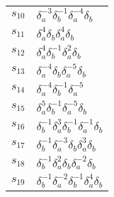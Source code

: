 \documentclass{article}
\begin{document}
\begin{center}
\begin{tabular}{ll}
$s_{10}$ & $\delta_a^{-3}\delta_b^{-1}\delta_a^{-4}\delta_b^{}$ \\
$s_{11}$ & $\delta_a^{4}\delta_b^{}\delta_a^{4}\delta_b^{}$ \\
$s_{12}$ & $\delta_a^{4}\delta_b^{-1}\delta_a^{2}\delta_b^{}$ \\
$s_{13}$ & $\delta_a^{-4}\delta_b^{}\delta_a^{-5}\delta_b^{}$ \\
$s_{14}$ & $\delta_a^{-4}\delta_b^{-1}\delta_a^{-5}$ \\
$s_{15}$ & $\delta_a^{5}\delta_b^{-1}\delta_a^{-5}\delta_b^{}$ \\
$s_{16}$ & $\delta_b^{-1}\delta_a^{3}\delta_b^{-1}\delta_a^{-1}\delta_b^{}$ \\
$s_{17}$ & $\delta_b^{-1}\delta_a^{-3}\delta_b^{}\delta_a^{3}\delta_b^{}$ \\
$s_{18}$ & $\delta_b^{-1}\delta_a^{2}\delta_b^{}\delta_a^{-2}\delta_b^{}$ \\
$s_{19}$ & $\delta_b^{-1}\delta_a^{-2}\delta_b^{-1}\delta_a^{4}\delta_b^{}$ \\
\bottomrule
\end{tabular}
\end{center}

\thispagestyle{empty}
\end{document}
